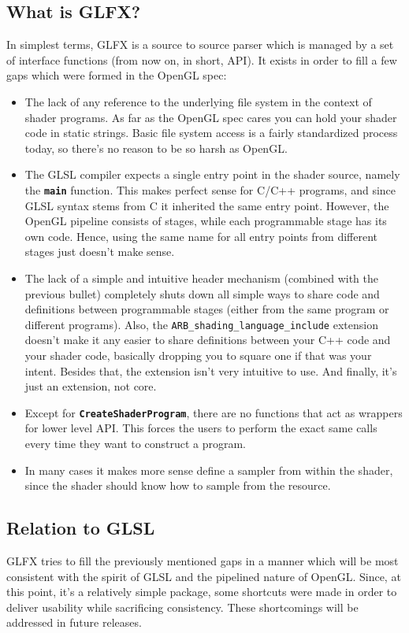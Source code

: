 \documentclass[11pt,a4paper,final,titlepage]{article}
\begin{document}
\subsection{What is GLFX?}
In simplest terms, GLFX is a source to source parser which is managed by a set of interface functions
(from now on, in short, API).
It exists in order to fill a few gaps which were formed in the OpenGL spec:
\begin{itemize}
\item The lack of any reference to the underlying file system in the context of shader programs.
As far as the OpenGL spec cares you can hold your shader code in static strings. Basic file system access
is a fairly standardized process today, so there's no reason to be so harsh as OpenGL.
\item The GLSL compiler expects a single entry point in the shader source, namely the
{\texttt{\textbf{main}}} function. This makes perfect sense for C/C++ programs, and since
GLSL syntax stems from C it inherited the same entry point. However, the OpenGL
pipeline consists of stages, while each programmable stage has its own code.
Hence, using the same name for all entry points from different stages just doesn't make sense.
\item The lack of a simple and intuitive header mechanism (combined with the previous bullet) completely
shuts down all simple ways to share code and definitions between programmable stages
(either from the same program or different programs).
Also, the \texttt{ARB\_\-shading\_\-language\_\-include} extension doesn't make
it any easier to share definitions between your C++ code and your shader code, basically dropping
you to square one if that was your intent.
Besides that, the extension isn't very intuitive to use. And finally, it's just an extension, not core.
\item Except for \texttt{\textbf{Create\-Shader\-Program}}, there are no functions that act as
wrappers for lower level API.
This forces the users to perform the exact same calls every time they want to construct a program.
\item In many cases it makes more sense define a sampler from within the shader, since the shader
should know how to sample from the resource.
\end{itemize}

\subsection{Relation to GLSL}
GLFX tries to fill the previously mentioned gaps in a manner which will be most consistent with
the spirit of GLSL and the pipelined nature of OpenGL. Since, at this point, it's a relatively simple
package, some shortcuts were made in order to deliver usability while sacrificing consistency.
These shortcomings will be addressed in future releases.
\end{document}
